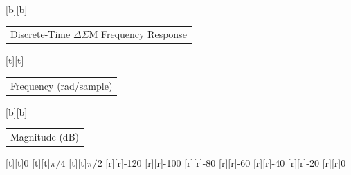 %    
%
%
\begin{psfrags}%
\psfragscanon%
%
[b][b]{\color[rgb]{0,0,0}\setlength{\tabcolsep}{0pt}\begin{tabular}{c}Discrete-Time $\Delta\Sigma$M Frequency Response\end{tabular}}%
[t][t]{\color[rgb]{0,0,0}\setlength{\tabcolsep}{0pt}\begin{tabular}{c}Frequency (rad/sample)\end{tabular}}%
[b][b]{\color[rgb]{0,0,0}\setlength{\tabcolsep}{0pt}\begin{tabular}{c}Magnitude (dB)\end{tabular}}%
%
[t][t]{0}%
[t][t]{$\pi/4$}%
[t][t]{$\pi/2$}%
%
[r][r]{-120}%
[r][r]{-100}%
[r][r]{-80}%
[r][r]{-60}%
[r][r]{-40}%
[r][r]{-20}%
[r][r]{0}%
%
%
\end{psfrags}%
%
